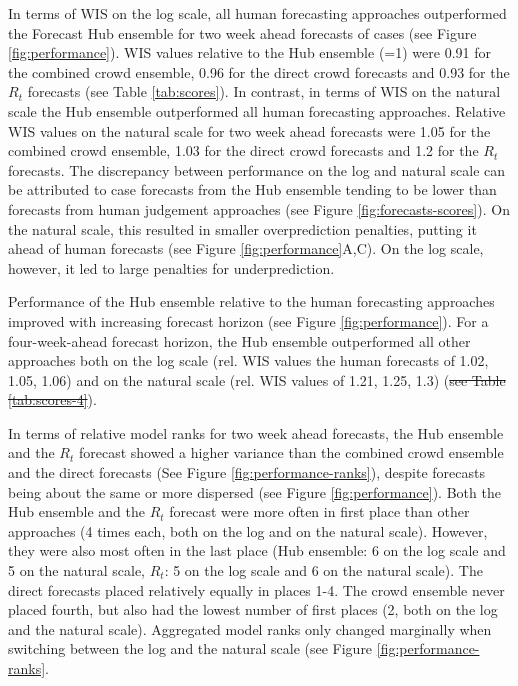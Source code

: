 \documentclass[10pt,a4paper,twocolumn]{article}
\providecommand{\DIFaddtex}[1]{{\protect\color{blue}\uwave{#1}}} %
\providecommand{\DIFdeltex}[1]{{\protect\color{red}\sout{#1}}}                      %
\providecommand{\DIFaddbegin}{} %
\providecommand{\DIFaddend}{} %
\providecommand{\DIFdelbegin}{} %
\providecommand{\DIFdelend}{} %
\providecommand{\DIFadd}[1]{\texorpdfstring{\DIFaddtex{#1}}{#1}} %
\providecommand{\DIFdel}[1]{\texorpdfstring{\DIFdeltex{#1}}{}} %
\begin{document}
In terms of WIS on the log scale, all human forecasting approaches outperformed the Forecast Hub ensemble for two week ahead forecasts of cases (see Figure \ref{fig:performance}). WIS values relative to the Hub ensemble (=1) were 0.91 for the combined crowd ensemble, 0.96 for the direct crowd forecasts and 0.93 for the $R_t$ forecasts (see Table \ref{tab:scores}). In contrast, in terms of WIS on the natural scale the Hub ensemble outperformed all human forecasting approaches. Relative WIS values on the natural scale for two week ahead forecasts were 1.05 for the combined crowd ensemble, 1.03 for the direct crowd forecasts and 1.2 for the $R_t$ forecasts. 
The discrepancy between performance on the log and natural scale  can be attributed to case forecasts from the Hub ensemble tending to be lower than forecasts from human judgement approaches (see Figure \ref{fig:forecasts-scores}). On the natural scale, this resulted in smaller overprediction penalties, putting it ahead of human forecasts (see Figure \ref{fig:performance}A,C). On the log scale, however, it led to large penalties for underprediction. 

Performance of the Hub ensemble relative to the human forecasting approaches improved with increasing forecast horizon (see Figure \ref{fig:performance}). For a four-week-ahead forecast horizon, the Hub ensemble outperformed all other approaches both on the log scale (rel. WIS values the human forecasts of 1.02, 1.05, 1.06) and on the natural scale (rel. WIS values of 1.21, 1.25, 1.3) (\DIFdelbegin \DIFdel{see Table \ref{tab:scores-4}}\DIFdelend \DIFaddbegin \DIFadd{compare Table 1 in the Supplementary Information \mbox{%
\cite{bosseSupplementaryInformationHuman2023}}\hskip0pt%
}\DIFaddend ). 

In terms of relative model ranks for two week ahead forecasts, the Hub ensemble and the $R_t$ forecast showed a higher variance than the combined crowd ensemble and the direct forecasts (See Figure \ref{fig:performance-ranks}), despite forecasts being about the same or more dispersed (see Figure \ref{fig:performance}). Both the Hub ensemble and the $R_t$ forecast were more often in first place than other approaches (4 times each, both on the log and on the natural scale). However, they were also most often in the last place (Hub ensemble: 6 on the log scale and 5 on the natural scale, $R_t$: 5 on the log scale and 6 on the natural scale). The direct forecasts placed relatively equally in places 1-4. The crowd ensemble never placed fourth, but also had the lowest number of first places (2, both on the log and the natural scale). Aggregated model ranks only changed marginally when switching between the log and the natural scale (see Figure \ref{fig:performance-ranks}. 
\end{document}
